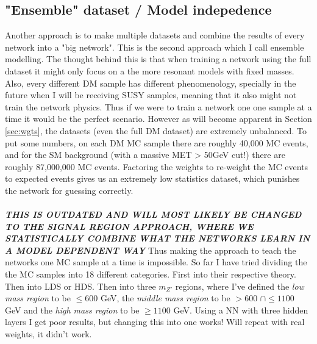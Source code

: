 \documentclass[14pt, a4paper]{book}
\begin{document}
\subsection*{"Ensemble" dataset / Model indepedence}
Another approach is to make multiple datasets and combine the results of every network into a "big network". This is the second approach which I call ensemble modelling. The thought behind this is that when 
training a network using the full dataset it might only focus on a the more resonant models with fixed masses. Also, every different DM sample has different phenomenology, specially in the future when I will 
be receiving SUSY samples, meaning that it also might not train the network physics. Thus if we were to train a network one one sample at a time it would be the perfect scenario. 
However as will become apparent in Section \ref{sec:wgts}, the datasets (even the full DM dataset) are extremely unbalanced. To put some numbers, on each DM MC sample there are roughly 40,000 MC events, 
and for the SM background (with a massive MET > 50GeV cut!) there are roughly 87,000,000 MC events. Factoring the weights to re-weight the MC events to expected events gives us an extremely low statistics dataset, which punishes the network for guessing correctly. \\
\\\textit{\textbf{THIS IS OUTDATED AND WILL MOST LIKELY BE CHANGED TO THE SIGNAL REGION APPROACH, WHERE WE STATISTICALLY COMBINE WHAT THE NETWORKS LEARN IN A MODEL DEPENDENT WAY}} Thus making the approach to teach the networks one MC sample at a time is impossible. So far I have tried dividing the the MC samples into 18 different categories. First into their respective theory. 
Then into LDS or HDS. Then into three $m_{Z'}$ regions, where I've defined the \textit{low mass region} to be $\le 600$ GeV, the \textit{middle mass region} to be $>600$ $\cap\le 1100$ GeV and 
the\textit{ high mass region }to be $\ge 1100$ GeV. Using a NN with three hidden layers I get poor results, but changing this into one works! Will repeat with real weights, it didn't work. 


\clearpage
\printbibliography
\end{document}
